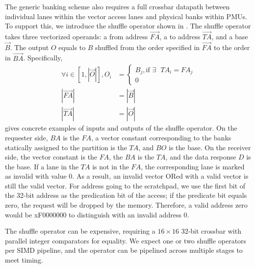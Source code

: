 The generic banking scheme also requires a full crossbar datapath between individual lanes within
the vector access lanes and physical banks within PMUs. 
To support this, we introduce the shuffle operator shown in .
The shuffle operator takes three vectorized operands: a from address $\overrightarrow{FA}$, a to address
$\overrightarrow{TA}$, and a base $\overrightarrow{B}$.
The output $O$ equals to $B$ shuffled from the order specified in $\overrightarrow{FA}$ to the order in
$\overrightarrow{BA}$. 
Specifically,
\begin{align}
\forall i \in [1,|\overrightarrow{O}|],
O_i &= \begin{cases}
B_j, \text{if $\exists$ $TA_i = FA_j$}\\
0
\end{cases} \\
|\overrightarrow{FA}| &= |\overrightarrow{B}| \\
|\overrightarrow{TA}| &= |\overrightarrow{O}|
\end{align}
 gives concrete examples of inputs and outputs of the shuffle operator.
On the requester side, $BA$ is the $FA$, a vector constant corresponding to the banks statically
assigned to the partition is the $TA$, and $BO$ is the base.
On the receiver side, the vector constant is the $FA$, the $BA$ is the $TA$, and the data response
$D$ is the base.
If a lane in the $TA$ is not in the $FA$, the corresponding lane is marked as invalid with value
$0$. As a result, an invalid vector ORed with a valid vector is still the valid vector.
For address going to the scratchpad, we use the first bit of the 32-bit address as the predication
bit of the access; if the predicate bit equals zero, the request will be dropped by the memory.
Therefore, a valid address zero would be xF0000000 to distinguish with an invalid address 0.

The shuffle operator can be expensive, requiring a $16\times16$ 32-bit crossbar with parallel
integer comparators for equality. We expect one or two shuffle operators per SIMD pipeline,
and the operator can be pipelined across multiple stages to meet timing.
